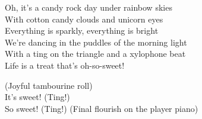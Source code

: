 \begin{lyrics}
Oh, it’s a candy rock day under rainbow skies\\
With cotton candy clouds and unicorn eyes\\
Everything is sparkly, everything is bright\\
We’re dancing in the puddles of the morning light\\
With a ting on the triangle and a xylophone beat\\
Life is a treat that’s oh-so-sweet!

(Joyful tambourine roll)\\
It’s sweet! (Ting!)\\
So sweet! (Ting!)
(Final flourish on the player piano)
\end{lyrics}

